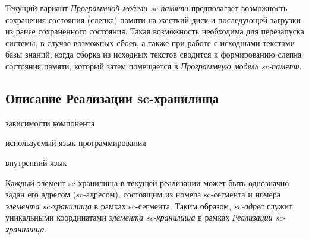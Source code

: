 Текущий вариант \textit{Программной модели sc-памяти} предполагает возможность сохранения состояния (слепка) памяти на жесткий диск и последующей загрузки из ранее сохраненного состояния. Такая возможность необходима для перезапуска системы, в случае возможных сбоев, а также при работе с исходными текстами базы знаний, когда сборка из исходных текстов сводится к формированию слепка состояния памяти, который затем помещается в \textit{Программную модель sc-памяти}.

\subsection{Описание Реализации sc-хранилища}

\begin{SCn}
\begin{scnindent}
    \begin{scnindent}
    \end{scnindent}
\end{scnindent}
\begin{scnrelfromset}{зависимости компонента}
\end{scnrelfromset}
\begin{scnrelfromlist}{используемый язык программирования}
\end{scnrelfromlist}
\begin{scnrelfromlist}{внутренний язык}
\end{scnrelfromlist}
\end{SCn}

Каждый элемент sc-хранилища в текущей реализации может быть однозначно задан его адресом (sc-адресом), состоящим из номера sc-сегмента и номера \textit{элемента sc-хранилища} в рамках sc-сегмента. Таким образом, \textit{sc-адрес} служит уникальными координатами \textit{элемента sc-хранилища} в рамках \textit{Реализации sc-хранилища}.

